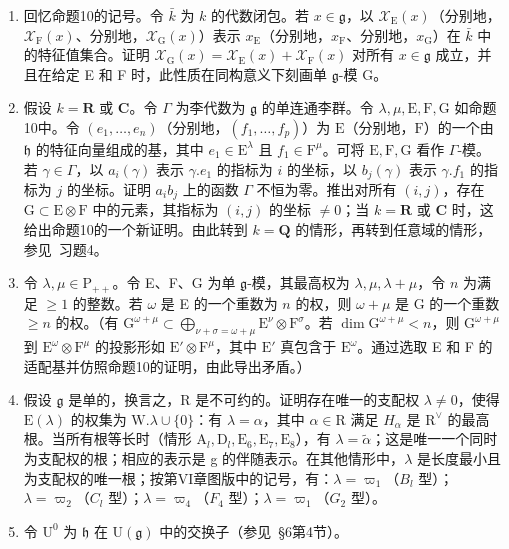 \begin{enumerate}
\def\labelenumi{\arabic{enumi})}
\setcounter{enumi}{18}
\item
  回忆命题10的记号。令 \(\bar{k}\) 为 \(k\) 的代数闭包。若 \(x \in \mathfrak{g}\)，以 \(\mathcal{X}_{\mathrm{E}}(x)\)（分别地，\(\mathcal{X}_{\mathrm{F}}(x)\)、分别地，\(\mathcal{X}_{\mathrm{G}}(x)\)）表示 \(x_{\mathrm{E}}\)（分别地，\(x_{\mathrm{F}}\)、分别地，\(x_{\mathrm{G}}\)）在 \(\bar{k}\) 中的特征值集合。证明 \(\mathcal{X}_{\mathrm{G}}(x) = \mathcal{X}_{\mathrm{E}}(x) + \mathcal{X}_{\mathrm{F}}(x)\) 对所有 \(x \in \mathfrak{g}\) 成立，并且在给定 E 和 F 时，此性质在同构意义下刻画单 \(\mathfrak{g}\)-模 G。
\item
  假设 \(k = \mathbf{R}\) 或 \(\mathbf{C}\)。令 \(\Gamma\) 为李代数为 \(\mathfrak{g}\) 的单连通李群。令 \(\lambda, \mu, \mathrm{E}, \mathrm{F}, \mathrm{G}\) 如命题10中。令 \((e_1, \ldots, e_n)\)（分别地，\((f_1, \ldots, f_p)\)）为 \(\mathrm{E}\)（分别地，\(\mathrm{F}\)）的一个由 \(\mathfrak{h}\) 的特征向量组成的基，其中 \(e_1 \in \mathrm{E}^\lambda\) 且 \(f_1 \in \mathrm{F}^\mu\)。可将 \(\mathrm{E}, \mathrm{F}, \mathrm{G}\) 看作 \(\Gamma\)-模。若 \(\gamma \in \Gamma\)，以 \(a_i(\gamma)\) 表示 \(\gamma.e_1\) 的指标为 \(i\) 的坐标，以 \(b_j(\gamma)\) 表示 \(\gamma.f_1\) 的指标为 \(j\) 的坐标。证明 \(a_i b_j\) 上的函数 \(\Gamma\) 不恒为零。推出对所有 \((i,j)\)，存在 \(\mathrm{G} \subset \mathrm{E} \otimes \mathrm{F}\) 中的元素，其指标为 \((i,j)\) 的坐标 \(\neq 0\)；当 \(k = \mathbf{R}\) 或 \(\mathbf{C}\) 时，这给出命题10的一个新证明。由此转到 \(k = \mathbf{Q}\) 的情形，再转到任意域的情形，参见~习题4。
\item
  令 \(\lambda, \mu \in \mathrm{P}_{++}\)。令 E、F、G 为单 \(\mathfrak{g}\)-模，其最高权为 \(\lambda, \mu, \lambda + \mu\)，令 \(n\) 为满足 \(\geq 1\) 的整数。若 \(\omega\) 是 E 的一个重数为 \(n\) 的权，则 \(\omega + \mu\) 是 G 的一个重数 \(\geq n\) 的权。（有 \(\mathrm{G}^{\omega + \mu} \subset \bigoplus_{\nu + \sigma = \omega + \mu} \mathrm{E}^{\nu} \otimes \mathrm{F}^{\sigma}\)。若 \(\dim \mathrm{G}^{\omega + \mu} < n\)，则 \(\mathrm{G}^{\omega + \mu}\) 到 \(\mathrm{E}^{\omega} \otimes \mathrm{F}^{\mu}\) 的投影形如 \(\mathrm{E}' \otimes \mathrm{F}^{\mu}\)，其中 \(\mathrm{E}'\) 真包含于 \(\mathrm{E}^{\omega}\)。通过选取 E 和 F 的适配基并仿照命题10的证明，由此导出矛盾。）
\item
  假设 \(\mathfrak{g}\) 是单的，换言之，R 是不可约的。证明存在唯一的支配权 \(\lambda \neq 0\)，使得 \(\mathrm{E}(\lambda)\) 的权集为 \(\mathrm{W}.\lambda \cup \{0\}\)：有 \(\lambda = \alpha\)，其中 \(\alpha \in \mathrm{R}\) 满足 \(H_{\alpha}\) 是 \(\mathrm{R}^{\vee}\) 的最高根。当所有根等长时（情形 \(\mathrm{A}_l,\mathrm{D}_l,\mathrm{E}_6,\mathrm{E}_7,\mathrm{E}_8\)），有 \(\lambda = \tilde{\alpha}\)；这是唯一一个同时为支配权的根；相应的表示是 g 的伴随表示。在其他情形中，\(\lambda\) 是长度最小且为支配权的唯一根；按第VI章图版中的记号，有：\(\lambda = \varpi_{1}\)（\(B_{l}\) 型）；\(\lambda = \varpi_{2}\)（\(C_{l}\) 型）；\(\lambda = \varpi_{4}\)（\(F_{4}\) 型）；\(\lambda = \varpi_{1}\)（\(G_{2}\) 型）。
\item
  令 \(\mathrm{U}^0\) 为 \(\mathfrak{h}\) 在 \(\mathrm{U}(\mathfrak{g})\) 中的交换子（参见~§6第4节）。
\end{enumerate}

